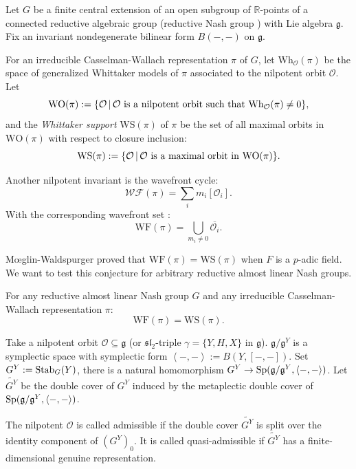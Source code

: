

Let $G$ be a finite central extension of an open subgroup of $\mathbb{R}$-points of a connected reductive algebraic group (reductive Nash group \cite{Sun15}) with Lie algebra $\mathfrak{g}$. Fix an invariant nondegenerate bilinear form $B(-,-)$ on $\mathfrak{g}$.


For an irreducible Casselman-Wallach representation $\pi$ of $G$, let $\mathrm{Wh}_\mathcal{O}(\pi)$ be the space of generalized Whittaker models of $\pi$ associated to the nilpotent orbit $\mathcal{O}$. Let
\[\mathrm{WO}(\pi):= \{\mathcal{O}\,|\,\textrm{$\mathcal{O}$ is a nilpotent orbit such that $\mathrm{Wh_{\mathcal{O}}(\pi) \neq 0}$}\},\]
and the \textit{Whittaker support} $\mathrm{WS}(\pi)$ of $\pi$ be the set of all maximal orbits in $\mathrm{WO}(\pi)$ with respect to closure inclusion:
\[\mathrm{WS}(\pi) := \{\mathcal{O}\,|\,\textrm{$\mathcal{O}$ is a maximal orbit in $\mathrm{WO}(\pi)$} \}.\]




Another nilpotent invariant is the wavefront cycle:
\[\mathcal{WF}(\pi) = \sum_{i}m_i [\mathcal{O}_i].\]
With the corresponding wavefront set :
\[\mathrm{WF}(\pi) = \bigcup\limits_{m_i \neq 0} \overline{\mathcal{O}_i}. \]



M{\oe}glin-Waldspurger \cite{MW87} proved that $\mathrm{WF}(\pi)=\mathrm{WS}(\pi)$ when $F$ is a $p$-adic field. We want to test this conjecture for arbitrary reductive almost linear Nash groups.
\begin{conj} For any reductive almost linear Nash group $G$ and any irreducible Casselman-Wallach representation $\pi$:
      \[\mathrm{WF}(\pi)=\mathrm{WS}(\pi).\]
\end{conj}

Take a nilpotent orbit $\mathcal{O} \subseteq \mathfrak{g}$ (or $\mathfrak{sl_2}$-triple $\gamma = \{Y,H,X\}$ in $\mathfrak{g}$). $\mathfrak{g}/\mathfrak{g}^{Y}$ is a symplectic space with symplectic form $\left \langle -,- \right \rangle := B(Y,[-,-])$. Set $G^{Y} := \operatorname{Stab}_{G}(Y)$, there is a natural homomorphism $G^{Y} \to \operatorname{Sp}(\mathfrak{g}/\mathfrak{g}^{Y},\left\langle -,- \right\rangle)$. Let $\widetilde{G^{Y}}$ be the double cover of $G^{Y}$ induced by the metaplectic double cover of $\operatorname{Sp}(\mathfrak{g}/\mathfrak{g}^{Y},\left\langle -,- \right\rangle)$.
\begin{defn}
   The nilpotent $\mathcal{O}$ is called admissible if the double cover $\widetilde{G^Y}$ is split over the identity component of $(G^Y)_0$. It is called quasi-admissible if $\widetilde{G^Y}$ has a finite-dimensional genuine representation.
\end{defn}

